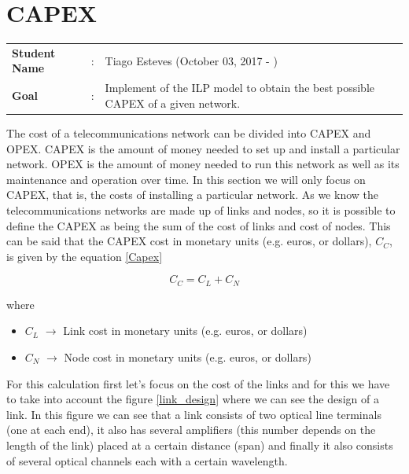 \clearpage

\section{CAPEX}\label{ILP_CAPEX}
\begin{tcolorbox}	
\begin{tabular}{p{2.75cm} p{0.2cm} p{10.5cm}} 	
\textbf{Student Name}  &:& Tiago Esteves    (October 03, 2017 - )\\
\textbf{Goal}          &:& Implement of the ILP model to obtain the best possible CAPEX of a given network.
\end{tabular}
\end{tcolorbox}
\vspace{11pt}

The cost of a telecommunications network can be divided into CAPEX and OPEX.
CAPEX is the amount of money needed to set up and install a particular network.
OPEX is the amount of money needed to run this network as well as its maintenance and operation over time.
In this section we will only focus on CAPEX, that is, the costs of installing a particular network.
As we know the telecommunications networks are made up of links and nodes, so it is possible to define the CAPEX as being the sum of the cost of links and cost of nodes.
This can be said that the CAPEX cost in monetary units (e.g. euros, or dollars), $C_C$, is given by the equation \ref{Capex}

\begin{equation}
C_C = C_L + C_N
\label{Capex}
\end{equation}

\noindent
where
\begin{itemize}
\item{$C_L$				$\rightarrow$	Link cost in monetary units (e.g. euros, or dollars)}
\item{$C_N$				$\rightarrow$	Node cost in monetary units (e.g. euros, or dollars)}
\end{itemize}


\vspace{11pt}
For this calculation first let's focus on the cost of the links and for this we have to take into account the figure \ref{link_design} where we can see the design of a link. In this figure we can see that a link consists of two optical line terminals (one at each end), it also has several amplifiers (this number depends on the length of the link) placed at a certain distance (span) and finally it also consists of several optical channels each with a certain wavelength.

